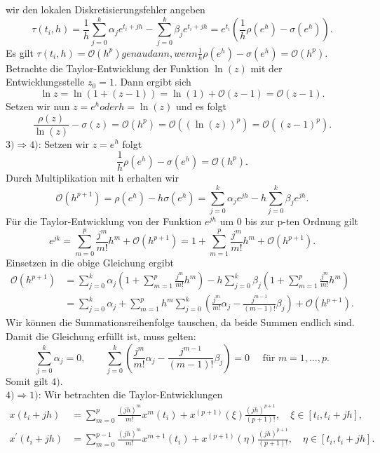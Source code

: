 wir den lokalen Diskretisierungsfehler angeben
\[
    \tau(t_i,h)= \frac{1}{h} \sum_{j=0}^{k} \alpha_j e^{t_i+jh} - \sum_{j=0}^{k} \beta_j e^{t_i+jh}
    = e^{t_i} \left( \frac{1}{h} \rho(e^h) - \sigma(e^{h}) \right).
\]
Es gilt $\tau(t_i,h)= \mathcal{O}(h^p) genau dann, wenn \frac{1}{h} \rho(e^h) - \sigma(e^h) = \mathcal{O}(h^p)$.
Betrachte die Taylor-Entwicklung der Funktion $\ln(z)$ mit der Entwicklungsstelle $z_0 = 1$. Dann ergibt sich
\[
    \ln z = \ln (1 + (z-1)) = \ln(1) + \mathcal{O}(z-1) = \mathcal{O}(z-1).
\]
Setzen wir nun $z=e^h oder h=\ln(z)$ und es folgt
\[
    \frac{\rho(z)}{\ln(z)} - \sigma(z) = \mathcal{O}(h^p) = \mathcal{O}((\ln(z))^p) = \mathcal{O}((z-1)^p).
\]
$3) \Rightarrow 4)$: Setzen wir $z=e^h$ folgt
\[
    \frac{1}{h} \rho(e^h) - \sigma(e^h) = \mathcal{O}(h^p).
\]
Durch Multiplikation mit h erhalten wir
\[
    \mathcal{O}(h^{p+1}) = \rho(e^h) - h \sigma(e^h) = \sum_{j=0}^{k} \alpha_j e^{jh} - h \sum_{j=0}^{k} \beta_j e^{jh}.
\]
Für die Taylor-Entwicklung von der Funktion $e^{jh}$ um $0$ bis zur p-ten Ordnung gilt
\[
    e^{jk} = \sum_{m=0}^{p} \frac{j^m}{m!}h^m + \mathcal{O}(h^{p+1})
    = 1 + \sum_{m=1}^{p} \frac{j^m}{m!}h^m + \mathcal{O}(h^{p+1}).
\]
Einsetzen in die obige Gleichung ergibt
\begin{align*}
    \mathcal{O}(h^{p+1})
    &= \sum_{j=0}^{k} \alpha_j  \left( 1 + \sum_{m=1}^{p} \frac{j^m}{m!}h^m \right)
    - h \sum_{j=0}^{k} \beta_j  \left( 1 + \sum_{m=1}^{p} \frac{j^m}{m!}h^m \right) \\
    &= \sum_{j=0}^{k}\alpha_j + \sum_{m=1}^{p} h^{m} \sum_{j=0}^{k}
    \left( \frac{j^m}{m!} \alpha_j - \frac{j^{m-1}}{(m-1)!}\beta_j \right) + \mathcal{O}(h^{p+1}).
\end{align*}
Wir können die Summationsreihenfolge tauschen, da beide Summen endlich sind. Damit die Gleichung erfüllt ist, muss
gelten:
\[
    \sum_{j=0}^{k} \alpha_j = 0, \qquad
    \sum_{j=0}^{k} \left( \frac{j^m}{m!}\alpha_j - \frac{j^{m-1}}{(m-1)!}\beta_j \right) = 0 \quad
    \text{ für } m = 1, \dots, p.
\]
Somit gilt $4)$.\\
$4) \Rightarrow 1)$: Wir betrachten die Taylor-Entwicklungen
\begin{align*}
    x(t_i + jh) &= \sum_{m=0}^{p} \frac{(jh)^m}{m!}x^{m}(t_i) + x^{(p+1)}(\xi)\frac{(jh)^{p+1}}{(p+1)!}, \quad
    \xi \in [t_i, t_i + jh], \\
    x^{\prime}(t_i + jh) &= \sum_{m=0}^{p-1} \frac{(jh)^m}{m!}x^{m+1}(t_i) + x^{(p+1)}(\eta)\frac{(jh)^{p+1}}{(p+1)!},
    \quad \eta \in [t_i, t_i + jh].
\end{align*}
